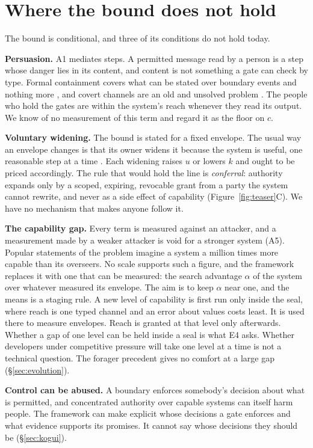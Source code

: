 \documentclass[10pt,twocolumn]{article}
\theoremstyle{plain}
\theoremstyle{definition}
\newcommand{\para}[1]{\smallskip\noindent\textbf{#1}\enspace}
\begin{document}
\section{Where the bound does not hold}\label{sec:limits}

The bound is conditional, and three of its conditions do not hold today.

\para{Persuasion.} A1 mediates steps. A permitted message read by a person is a step whose
danger lies in its content, and content is not something a gate can check by type. Formal
containment covers what can be stated over boundary events and nothing more
\cite{moon2026}, and covert channels are an old and unsolved problem \cite{lampson1973}. The
people who hold the gates are within the system's reach whenever they read its output. We
know of no measurement of this term and regard it as the floor on $c$.

\para{Voluntary widening.} The bound is stated for a fixed envelope. The usual way an
envelope changes is that its owner widens it because the system is useful, one reasonable
step at a time \cite{kulveit2025}. Each widening raises $u$ or lowers $k$ and ought to be
priced accordingly. The rule that would hold the line is \emph{conferral}: authority expands
only by a scoped, expiring, revocable grant from a party the system cannot rewrite, and never
as a side effect of capability (Figure~\ref{fig:teaser}C). We have no mechanism that makes
anyone follow it.

\para{The capability gap.} Every term is measured against an attacker, and a measurement made
by a weaker attacker is void for a stronger system (A5). Popular statements of the problem
imagine a system a million times more capable than its overseers. No scale supports such a
figure, and the framework replaces it with one that can be measured: the search advantage
$\alpha$ of the system over whatever measured its envelope. The aim is to keep $\alpha$ near
one, and the means is a staging rule. A new level of capability is first run only inside the
seal, where reach is one typed channel and an error about values costs least. It is used
there to measure envelopes. Reach is granted at that level only afterwards. Whether a gap of
one level can be held inside a seal is what E4 asks. Whether developers under competitive
pressure will take one level at a time is not a technical question. The forager precedent
gives no comfort at a large gap (\S\ref{sec:evolution}).

\para{Control can be abused.} A boundary enforces somebody's decision about what is
permitted, and concentrated authority over capable systems can itself harm people. The
framework can make explicit whose decisions a gate enforces and what evidence supports its
promises. It cannot say whose decisions they should be (\S\ref{sec:kogui}).
\end{document}
